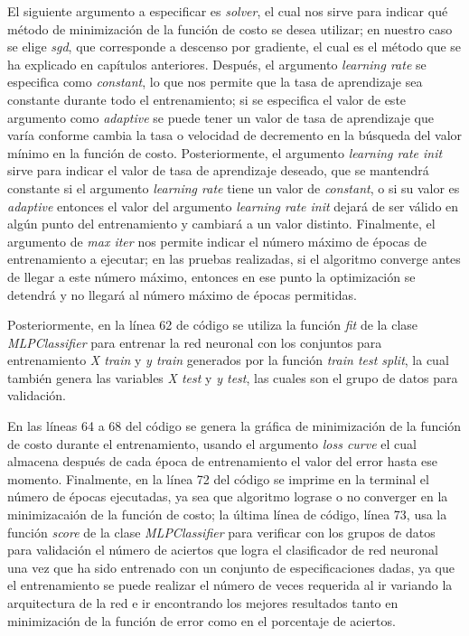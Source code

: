 El siguiente argumento a especificar es \textit{solver}, el cual nos sirve para indicar qué método de minimización de la función de costo se desea utilizar; en nuestro caso se elige \textit{sgd}, que corresponde a descenso 
por gradiente, el cual es el método que se ha explicado en capítulos anteriores. Después, el argumento \textit{learning rate} se especifica como \textit{constant}, lo que nos permite que la tasa de aprendizaje sea constante 
durante todo el entrenamiento; si se especifica el valor de este argumento como \textit{adaptive} se puede tener un valor de tasa de aprendizaje que varía conforme cambia la tasa o velocidad de decremento en la búsqueda 
del valor mínimo en la función de costo. Posteriormente, el argumento \textit{learning rate init} sirve para indicar el valor de tasa de aprendizaje deseado, que se mantendrá constante si el argumento \textit{learning rate} 
tiene un valor de \textit{constant}, o si su valor es \textit{adaptive} entonces el valor del argumento \textit{learning rate init} dejará de ser válido en algún punto del entrenamiento y cambiará a un valor distinto. 
Finalmente, el argumento de \textit{max iter} nos permite indicar el número máximo de épocas de entrenamiento a ejecutar; en las pruebas realizadas, si el algoritmo converge antes de llegar a este número máximo, entonces 
en ese punto la optimización se detendrá y no llegará al número máximo de épocas permitidas.

Posteriormente, en la línea 62 de código se utiliza la función \textit{fit} de la clase \textit{MLPClassifier} para entrenar la red neuronal con los conjuntos para entrenamiento \textit{X train} y \textit{y train} generados 
por la función \textit{train test split}, la cual también genera las variables \textit{X test} y \textit{y test}, las cuales son el grupo de datos para validación.

En las líneas 64 a 68 del código se genera la gráfica de minimización de la función de costo durante el entrenamiento, usando el argumento \textit{loss curve} el cual almacena después de cada época de entrenamiento el valor 
del error hasta ese momento. Finalmente, en la línea 72 del código se imprime en la terminal el número de épocas ejecutadas, ya sea que algoritmo lograse o no converger en la minimizacaión de la función de costo; la última 
línea de código, línea 73, usa la función \textit{score} de la clase \textit{MLPClassifier} para verificar con los grupos de datos para validación el número de aciertos que logra el clasificador de red neuronal una vez que 
ha sido entrenado con un conjunto de especificaciones dadas, ya que el entrenamiento se puede realizar el número de veces requerida al ir variando la arquitectura de la red e ir encontrando los mejores resultados tanto en 
minimización de la función de error como en el porcentaje de aciertos. 

